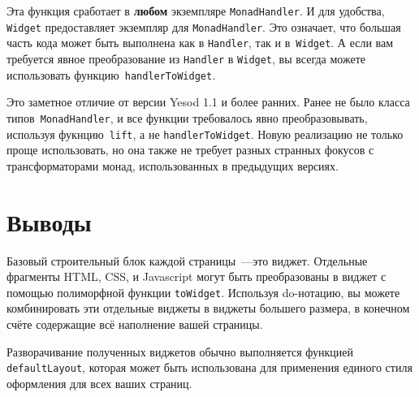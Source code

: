 Эта функция сработает в \textbf{любом} экземпляре \lstinline'MonadHandler'. И
для удобства, \lstinline'Widget' предоставляет экземпляр для
\lstinline'MonadHandler'. Это означает, что большая часть кода может быть
выполнена как в \lstinline'Handler', так и в~\lstinline'Widget'. А если вам
требуется явное преобразование из \lstinline'Handler' в \lstinline'Widget', вы
всегда можете использовать функцию~\lstinline'handlerToWidget'.

\begin{remark}
    Это заметное отличие от версии Yesod 1.1 и более ранних. Ранее не было
    класса типов~\lstinline'MonadHandler', и все функции требовалось явно
    преобразовывать, используя фукнцию~\lstinline'lift', а не
    \lstinline'handlerToWidget'. Новую реализацию не только проще использовать,
    но она также не требует разных странных фокусов с трансформаторами монад,
    использованных в предыдущих версиях.
\end{remark}

\section{Выводы}
Базовый строительный блок каждой страницы~---это виджет. Отдельные фрагменты
HTML, CSS, и Javascript могут быть преобразованы в виджет с помощью полиморфной
функции \lstinline'toWidget'. Используя do-нотацию, вы можете комбинировать эти
отдельные виджеты в виджеты большего размера, в конечном счёте содержащие всё
наполнение вашей страницы.

Разворачивание полученных виджетов обычно выполняется функцией
\lstinline'defaultLayout', которая может быть использована для применения
единого стиля оформления для всех ваших страниц.
